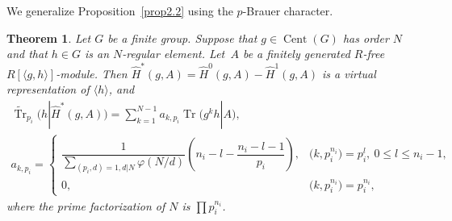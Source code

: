 \documentclass[11pt]{article}
\numberwithin{equation}{section}
\numberwithin{equation}{section}
\newtheorem{Theorem}{Theorem}[section]
\begin{document}
We generalize Proposition~\ref{prop2.2} \cite[Proposition~2.2]{BR} using the $p$-Brauer character.

\begin{Theorem} \label{2.2kai}
Let $G$ be a finite group. Suppose that $g \in \operatorname{Cent}(G)$ has order $N$ and that $h \in G$ is an $N$-regular element. Let~$A$ be a finitely generated $R$-free $R[\langle g,h \rangle]$-module. Then $\hat{H}^*(g,A)=\hat{H}^0(g,A)-\hat{H}^1(g,A)$ is a virtual representation of $\langle h \rangle$, and
\begin{gather*}
\widetilde{\operatorname{Tr}}_{p_i}(h|\hat{H}^*(g,A))=\sum_{k=1}^{N-1}a_{k,p_i}\operatorname{Tr}\big(g^kh|A\big) ,
\\
a_{k,p_i}=\begin{cases}
\dfrac{1}{\sum_{(p_i,d)=1,d|N}\varphi (N/d)}\left(n_i-l-\dfrac{n_i-l-1}{p_i}\right), & \big(k,p_i^{n_i}\big)=p_i^l, \ 0\leq l \leq n_i-1, \\
0, & \big(k,p_i^{n_i}\big)=p_i^{n_i},
\end{cases}
\end{gather*}
where the prime factorization of $N$ is $\prod p_i^{n_i}$.
\end{Theorem}
\end{document}
